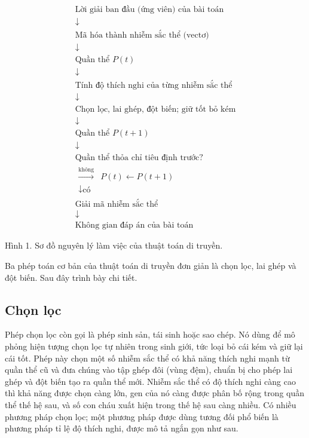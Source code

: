 \documentclass[11pt]{article}
\begin{document}
\[
\begin{array}{c}
\text{Lời giải ban đầu (ứng viên) của bài toán}\\
\downarrow\\
\text{Mã hóa thành nhiễm sắc thể (vectơ)}\\
\downarrow\\
\text{Quần thể }P(t)\\
\downarrow\\
\text{Tính độ thích nghi của từng nhiễm sắc thể}\\
\downarrow\\
\text{Chọn lọc, lai ghép, đột biến; giữ tốt bỏ kém}\\
\downarrow\\
\text{Quần thể }P(t+1)\\
\downarrow\\
\text{Quần thể thỏa chỉ tiêu định trước?}\\
\begin{array}{cc}
\xrightarrow{\text{không}} & P(t)\leftarrow P(t+1)\\
\downarrow\scriptstyle{\text{có}} &
\end{array}\\
\text{Giải mã nhiễm sắc thể}\\
\downarrow\\
\text{Không gian đáp án của bài toán}
\end{array}
\]
\begin{center}
Hình 1. Sơ đồ nguyên lý làm việc của thuật toán di truyền.
\end{center}

Ba phép toán cơ bản của thuật toán di truyền đơn giản là chọn lọc, lai ghép
và đột biến. Sau đây trình bày chi tiết.

\subsection{Chọn lọc}

Phép chọn lọc còn gọi là phép sinh sản, tái sinh hoặc sao chép. Nó dùng để mô
phỏng hiện tượng chọn lọc tự nhiên trong sinh giới, tức loại bỏ cái kém và
giữ lại cái tốt. Phép này chọn một số nhiễm sắc thể có khả năng thích nghi
mạnh từ quần thể cũ và đưa chúng vào tập ghép đôi (vùng đệm), chuẩn bị cho
phép lai ghép và đột biến tạo ra quần thể mới. Nhiễm sắc thể có độ thích
nghi càng cao thì khả năng được chọn càng lớn, gen của nó càng được phân bố
rộng trong quần thể thế hệ sau, và số con cháu xuất hiện trong thế hệ sau
càng nhiều. Có nhiều phương pháp chọn lọc; một phương pháp được dùng tương
đối phổ biến là phương pháp tỉ lệ độ thích nghi, được mô tả ngắn gọn như sau.
\end{document}
